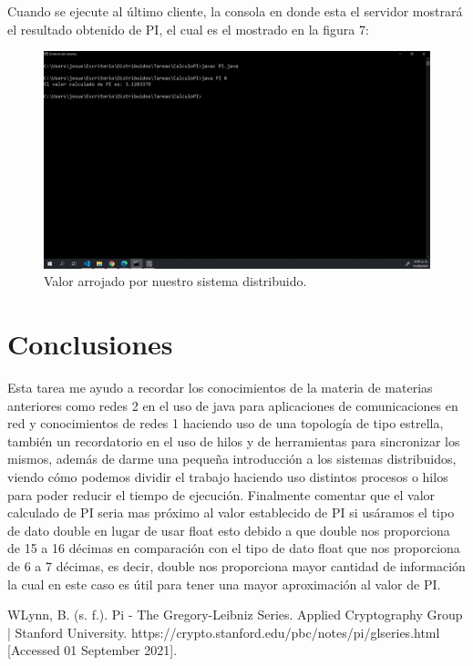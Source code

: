 \documentclass[11pt]{article}
\begin{document}
		Cuando se ejecute al último cliente, la consola en donde esta el servidor mostrará el resultado obtenido de PI, el cual es el mostrado en la figura 7:
		\begin{figure}[H]
			\centering
			\includegraphics[scale=0.34]{resources/resultado.png}
			\caption{Valor arrojado por nuestro sistema distribuido. }\label{fig:picture}
		\end{figure}
	\section{Conclusiones}
	Esta tarea me ayudo a recordar los conocimientos de la materia de materias anteriores como redes 2 en el uso de java para aplicaciones de comunicaciones en red y conocimientos de redes 1 haciendo uso de una topología de tipo estrella, también un recordatorio en el uso de hilos y de herramientas para sincronizar los mismos, además de darme una pequeña introducción a los sistemas distribuidos, viendo cómo podemos dividir el trabajo haciendo uso distintos procesos o hilos para poder reducir el tiempo de ejecución. Finalmente comentar que el valor calculado de PI seria mas próximo al valor establecido de PI si usáramos el tipo de dato double en lugar de usar float esto debido a que double nos proporciona de 15 a 16 décimas en comparación con el tipo de dato float que nos proporciona de 6 a 7 décimas, es decir, double nos proporciona mayor cantidad de información la cual en este caso es útil para tener una mayor aproximación al valor de PI.
	\begin{thebibliography}{1}
  WLynn, B. (s. f.). Pi - The Gregory-Leibniz Series. Applied Cryptography Group | Stanford University. https://crypto.stanford.edu/pbc/notes/pi/glseries.html [Accessed 01 September 2021].
\end{thebibliography}
\end{document}
